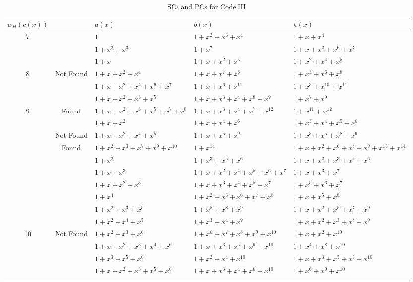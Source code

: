 	\begin{table}[htbp]
		\caption{SCs and PCs for Code III}
		\centering
		\begin{tabularx}{0.85\textwidth}{|c|c|XXX} 
			\toprule
			$w_H(c(x))$&~& $a(x)$ & $b(x)$ & $h(x)$ \\ %
			\midrule
			7&~&$1$ & $1+x^2+x^3+x^4$ & $1+x+x^{4}$\\
			  &~&$1+x^2+x^3$ & $1+x^7$ & $1+x+x^2+x^6+x^7$\\
			\cline{1-5}
			&&$1+x$ 						& $1+x+x^2+x^5$ 			& $1+x^2+x^4+x^5$\\
			8&Not Found&$1+x+x^2+x^4$ 				& $1+x+x^7+x^8$ 			& $1+x^3+x^6+x^8$\\
			&&$1+x+x^2+x^4+x^6+x^7$ 	& $1+x+x^6+x^{11}$ 			& $1+x^3+x^{10}+x^{11}$\\
			\cline{1-5}
			&~&$1+x+x^2+x^3+x^5$ & $1+x+x^3+x^4+x^8+x^9$ & $1+x^7+x^9$\\
			9&Found&$1+x+x^2+x^3+x^5+x^7+x^8$ & $1+x+x^3+x^4+x^7+x^{12}$ & $1+x^{11}+x^{12}$\\
			\cline{2-5}
			 ~&~&$1+x+x^2$ 					& $1+x+x^4+x^6$ 			& $1+x^{3}+x^{4}+x^5+x^6$\\
			&Not Found&$1+x+x^2+x^4+x^5$ 		& $1+x+x^5+x^9$ 			& $1+x^{3}+x^{5}+x^8+x^9$\\
			\cline{1-5}
			&Found&$1+x^2+x^3+x^7+x^9+x^{10}$ & $1+x^{14}$ & $1+x+x^2+x^6+x^8+x^9+x^{13}+x^{14}$\\
						\cline{2-5}
			&&$1+x^2$ 								& $1+x^3+x^5+x^6$ 					& $1+x+x^2+x^{3}+x^{4}+x^6$\\
			&&$1+x+x^3$ 								& $1+x+x^2+x^4+x^5+x^6+x^7$ 	& $1+x+x^{3}+x^{7}$\\
			&&$1+x+x^2+x^3$ 				& $1+x+x^3+x^4+x^5+x^7$ 			& $1+x^{5}+x^6+x^7$\\
			&&$1+x^4$ 								& $1+x^2+x^3+x^6+x^7+x^8$ 		& $1+x+x^{5}+x^8$\\
			&&$1+x^2+x^3+x^5$ 						& $1+x^5+x^8+x^9$ 					& $1+x+x^{2}+x^5+x^7+x^9$\\
			&~&$1+x^2+x^4+x^5$ 						& $1+x^3+x^4+x^9$ 					& $1+x+x^{2}+x^3+x^8+x^9$\\
			10&Not Found&$1+x^2+x^3+x^6$ 						& $1+x^6+x^7+x^8+x^9+x^{10}$ 	& $1+x+x^2+x^{10}$\\
			&&$1+x+x^2+x^3+x^4+x^6$ 				& $1+x+x^3+x^5+x^9+x^{10}$ 		& $1+x^4+x^8+x^{10}$\\
			&&$1+x^3+x^5+x^6$ 						& $1+x^2+x^4+x^{10}$ 				& $1+x+x^{3}+x^{5}+x^9+x^{10}$\\
			&&$1+x+x^2+x^3+x^5+x^6$ 				& $1+x+x^3+x^4+x^6+x^{10}$ 		& $1+x^{6}+x^{9}+x^{10}$\\

\end{tabularx}
\end{table}
